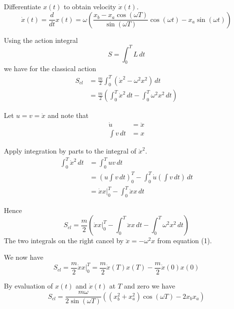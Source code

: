 \documentclass[12pt]{article}
\begin{document}
Differentiate $x(t)$ to obtain velocity $\dot x(t)$.
\begin{equation*}
\dot x(t)=\frac{d}{dt}x(t)=
\omega\left(
\frac{x_b-x_a\cos(\omega T)}{\sin(\omega T)}\cos(\omega t)-x_a\sin(\omega t)
\right)
\tag{3}
\end{equation*}

Using the action integral
\begin{equation*}
S=\int_0^T L\,dt
\end{equation*}
we have for the classical action
\begin{align*}
S_{cl}&=\frac{m}{2}\int_0^T (\dot{x}^2-\omega^2 x^2)\,dt
\\[1ex]
&=\frac{m}{2}\left(
\int_0^T\dot{x}^2\,dt
-\int_0^T\omega^2x^2\,dt\right)
\end{align*}

Let $u=v=\dot x$ and note that
\begin{align*}
\dot u&=\ddot x
\\[1ex]
\int v\,dt&=x
\end{align*}

Apply integration by parts to the integral of $\dot x^2$.
\begin{align*}
\int_0^T \dot x^2\,dt
&=\int_0^T uv\,dt
\\[1ex]
&=\left(u\int v\,dt\right)_0^T
-\int_0^T\dot u\left(\int v\,dt\right)\,dt
\\[1ex]
&=\dot xx\bigg|_0^T-\int_0^T \ddot xx\,dt
\end{align*}

Hence
\begin{equation*}
S_{cl}=\frac{m}{2}\left(
\dot xx\bigg|_0^T-\int_0^T \ddot xx\,dt
-\int_0^T\omega^2x^2\,dt
\right)
\end{equation*}
The two integrals on the right cancel by $\ddot x=-\omega^2x$ from equation (1).

\bigskip
We now have
\begin{equation*}
S_{cl}=\frac{m}{2}\dot xx\bigg|_0^T
=\frac{m}{2}\dot x(T)x(T)-\frac{m}{2}\dot x(0)x(0)
\tag{4}
\end{equation*}

By evaluation of $x(t)$ and $\dot x(t)$ at $T$ and zero we have
\begin{equation*}
S_{cl}=\frac{m\omega}{2\sin(\omega T)}
\left(\left(x_b^2+x_a^2\right)\cos(\omega T)-2x_b x_a\right)
\tag{5}
\end{equation*}
\end{document}
